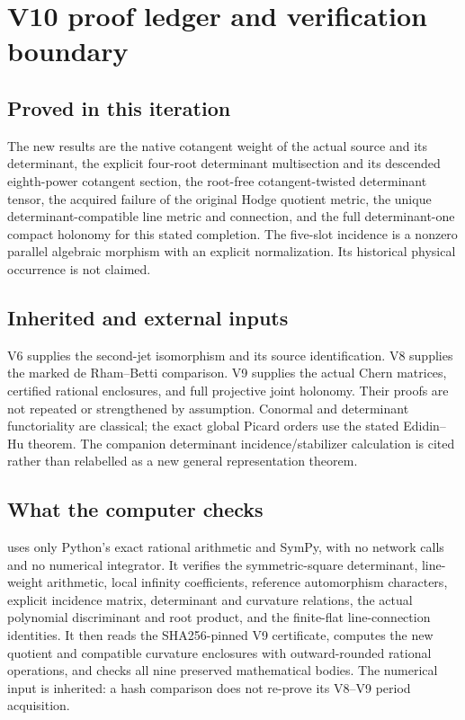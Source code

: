 \documentclass[11pt]{article}
\theoremstyle{definition}
\theoremstyle{remark}
\begin{document}
\section{V10 proof ledger and verification boundary}
\label{sec:v10-status}

\subsection{Proved in this iteration}
The new results are the native cotangent weight of the actual source and
its determinant, the explicit four-root determinant multisection and its
descended eighth-power cotangent section, the root-free cotangent-twisted
determinant tensor, the acquired failure of the original Hodge quotient
metric, the unique determinant-compatible line metric and connection,
and the full determinant-one compact holonomy for this stated completion.
The five-slot incidence is a nonzero parallel algebraic morphism with an
explicit normalization. Its historical physical occurrence is not claimed.

\subsection{Inherited and external inputs}
V6 supplies the second-jet isomorphism and its source identification.
V8 supplies the marked de Rham--Betti comparison. V9 supplies the actual
Chern matrices, certified rational enclosures, and full projective joint
holonomy. Their proofs are not repeated or strengthened by assumption.
Conormal and determinant functoriality are classical; the exact global
Picard orders use the stated Edidin--Hu theorem. The companion determinant
incidence/stabilizer calculation is cited rather than relabelled as a new
general representation theorem.

\subsection{What the computer checks}
 uses only
Python's exact rational arithmetic and SymPy, with no network calls and no
numerical integrator. It verifies the symmetric-square determinant,
line-weight arithmetic, local infinity coefficients, reference
automorphism characters, explicit incidence matrix, determinant and
curvature relations, the actual polynomial discriminant and root product,
and the finite-flat line-connection identities. It then reads the
SHA256-pinned V9 certificate, computes the new quotient and compatible
curvature enclosures with outward-rounded rational operations, and checks
all nine preserved mathematical bodies. The numerical input is inherited:
a hash comparison does not re-prove its V8--V9 period acquisition.
\end{document}
